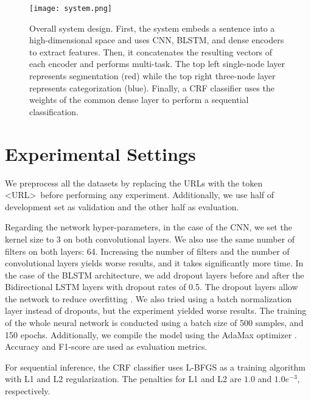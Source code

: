 \documentclass[11pt,letterpaper]{article}
\begin{document}
\begin{figure}
\texttt{[image: system.png]}
\caption{ \small Overall system design. First, the system embeds a sentence into a high-dimensional space and uses CNN, BLSTM, and dense encoders to extract features. Then, it concatenates the resulting vectors of each encoder and performs multi-task. The top left single-node layer represents segmentation (red) while the top right three-node layer represents categorization (blue). Finally, a CRF classifier uses the weights of the common dense layer to perform a sequential classification. }
\label{fig:system_overview}
\end{figure}

\section{Experimental Settings} 

We preprocess all the datasets by replacing the URLs with the token \textless URL\textgreater~before performing any experiment. Additionally, we use half of development set as validation and the other half as evaluation.

Regarding the network hyper-parameters, in the case of the CNN, we set the kernel size to 3 on both convolutional layers. We also use the same number of filters on both layers: 64. Increasing the number of filters and the number of convolutional layers yields worse results, and it takes significantly more time. In the case of the BLSTM architecture, we add dropout layers before and after the Bidirectional LSTM layers with dropout rates of 0.5. The dropout layers allow the network to reduce overfitting \cite{Srivastava:2014:DSW:2627435.2670313}. We also tried using a batch normalization layer instead of dropouts, but the experiment yielded worse results. The training of the whole neural network is conducted using a batch size of 500 samples, and 150 epochs. Additionally, we compile the model using the AdaMax optimizer \cite{DBLP:journals/corr/KingmaB14}. Accuracy and F1-score are used as evaluation metrics.

For sequential inference, the CRF classifier uses L-BFGS as a training algorithm with L1 and L2 regularization. The penalties for L1 and L2 are $1.0$ and $1.0e^{-3}$, respectively.
\end{document}
